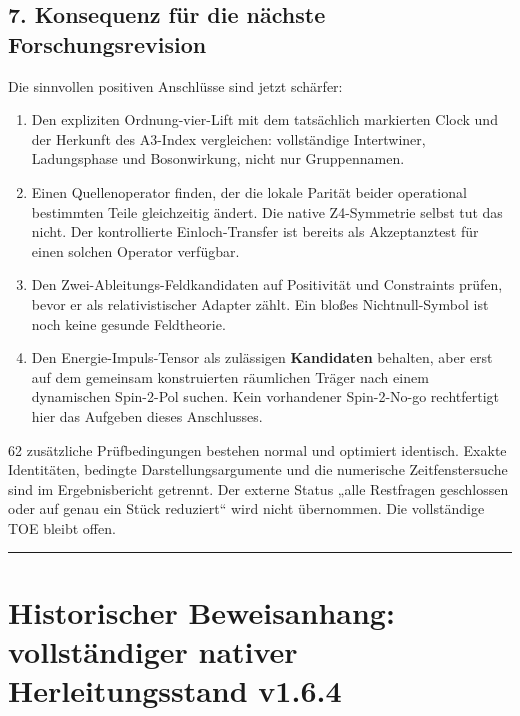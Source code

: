 \subsection{7. Konsequenz für die nächste
Forschungsrevision}\label{konsequenz-fuxfcr-die-nuxe4chste-forschungsrevision}

Die sinnvollen positiven Anschlüsse sind jetzt schärfer:

\begin{enumerate}
\def\labelenumi{\arabic{enumi}.}
\tightlist
\item
  Den expliziten Ordnung-vier-Lift mit dem tatsächlich markierten Clock
  und der Herkunft des A3-Index vergleichen: vollständige Intertwiner,
  Ladungsphase und Bosonwirkung, nicht nur Gruppennamen.
\item
  Einen Quellenoperator finden, der die lokale Parität beider
  operational bestimmten Teile gleichzeitig ändert. Die native
  Z4-Symmetrie selbst tut das nicht. Der kontrollierte Einloch-Transfer
  ist bereits als Akzeptanztest für einen solchen Operator verfügbar.
\item
  Den Zwei-Ableitungs-Feldkandidaten auf Positivität und Constraints
  prüfen, bevor er als relativistischer Adapter zählt. Ein bloßes
  Nichtnull-Symbol ist noch keine gesunde Feldtheorie.
\item
  Den Energie-Impuls-Tensor als zulässigen \textbf{Kandidaten} behalten,
  aber erst auf dem gemeinsam konstruierten räumlichen Träger nach einem
  dynamischen Spin-2-Pol suchen. Kein vorhandener Spin-2-No-go
  rechtfertigt hier das Aufgeben dieses Anschlusses.
\end{enumerate}

62 zusätzliche Prüfbedingungen bestehen normal und optimiert identisch.
Exakte Identitäten, bedingte Darstellungsargumente und die numerische
Zeitfenstersuche sind im Ergebnisbericht getrennt. Der externe Status
„alle Restfragen geschlossen oder auf genau ein Stück reduziert`` wird
nicht übernommen. Die vollständige TOE bleibt offen.

\begin{center}\rule{0.5\linewidth}{0.5pt}\end{center}

\section{Historischer Beweisanhang: vollständiger nativer
Herleitungsstand
v1.6.4}\label{historischer-beweisanhang-vollstuxe4ndiger-nativer-herleitungsstand-v1.6.4}

